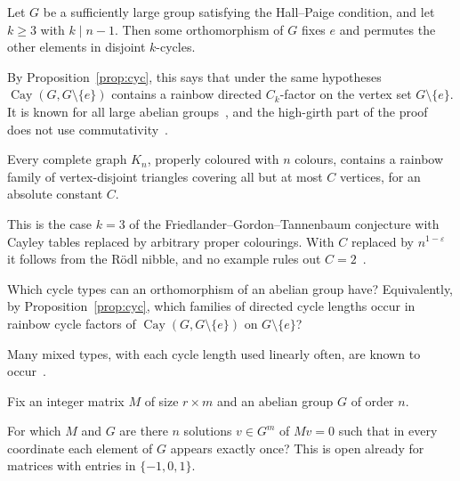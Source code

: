 
\begin{conjecture}\label{conj:fgt-all}
Let $G$ be a sufficiently large group satisfying the Hall--Paige condition, and let $k\geq3$ with $k\mid n-1$. Then some orthomorphism of $G$ fixes $e$ and permutes the other elements in disjoint $k$-cycles.
\end{conjecture}

By Proposition~\ref{prop:cyc}, this says that under the same hypotheses $\operatorname{Cay}(G,G\setminus\{e\})$ contains a rainbow directed $C_k$-factor on the vertex set $G\setminus\{e\}$. It is known for all large abelian groups~\cite{muy23}, and the high-girth part of the proof does not use commutativity~\cite[\S7.1]{muy23}.

\begin{conjecture}\label{conj:triangles}
Every complete graph $K_n$, properly coloured with $n$ colours, contains a rainbow family of vertex-disjoint triangles covering all but at most $C$ vertices, for an absolute constant $C$.
\end{conjecture}

This is the case $k=3$ of the Friedlander--Gordon--Tannenbaum conjecture with Cayley tables replaced by arbitrary proper colourings. With $C$ replaced by $n^{1-\varepsilon}$ it follows from the R\"odl nibble, and no example rules out $C=2$~\cite[\S7.1]{muy23}.

\begin{problem}\label{prob:cycle-types}
Which cycle types can an orthomorphism of an abelian group have? Equivalently, by Proposition~\ref{prop:cyc}, which families of directed cycle lengths occur in rainbow cycle factors of $\operatorname{Cay}(G,G\setminus\{e\})$ on $G\setminus\{e\}$?
\end{problem}

Many mixed types, with each cycle length used linearly often, are known to occur~\cite[\S7.2]{muy23}.


Fix an integer matrix $M$ of size $r\times m$ and an abelian group $G$ of order $n$.

\begin{problem}\label{prob:equation}
For which $M$ and $G$ are there $n$ solutions $v\in G^m$ of $Mv=0$ such that in every coordinate each element of $G$ appears exactly once? This is open already for matrices with entries in $\{-1,0,1\}$.
\end{problem}

